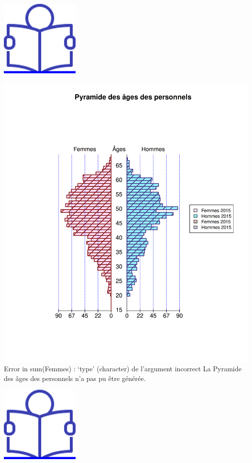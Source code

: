 \href{../Docs/Notices/fiche_2.odt}{\includegraphics{icones/Notice.png}}

\includegraphics{altair_files/figure-latex/unnamed-chunk-11-1.png} Error
in sum(Femmes) : `type' (character) de l'argument incorrect La Pyramide
des âges des personnels n'a pas pu être générée.

\href{../Docs/Notices/fiche_3.odt}{\includegraphics{icones/Notice.png}}

